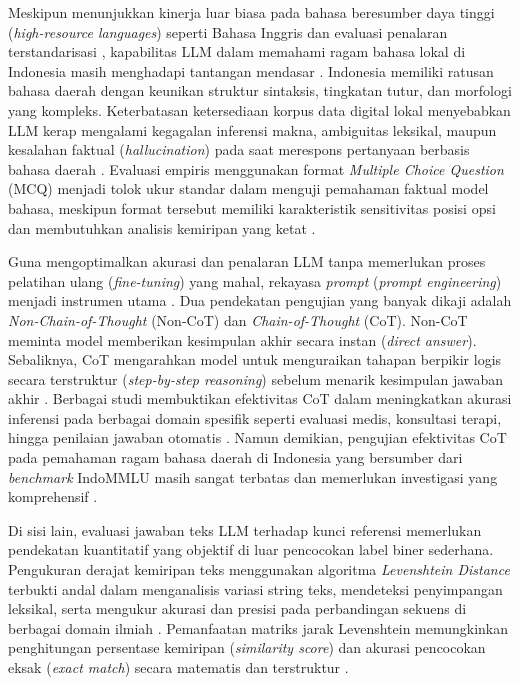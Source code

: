 \documentclass[10pt,a4paper]{article}
\begin{document}
Meskipun menunjukkan kinerja luar biasa pada bahasa beresumber daya tinggi (\textit{high-resource languages}) seperti Bahasa Inggris dan evaluasi penalaran terstandarisasi \cite{hendrycks2021measuring}, kapabilitas LLM dalam memahami ragam bahasa lokal di Indonesia masih menghadapi tantangan mendasar \cite{koto2023indommlu}. Indonesia memiliki ratusan bahasa daerah dengan keunikan struktur sintaksis, tingkatan tutur, dan morfologi yang kompleks. Keterbatasan ketersediaan korpus data digital lokal menyebabkan LLM kerap mengalami kegagalan inferensi makna, ambiguitas leksikal, maupun kesalahan faktual (\textit{hallucination}) pada saat merespons pertanyaan berbasis bahasa daerah \cite{koto2023indommlu, mugaanyi2024evaluation}. Evaluasi empiris menggunakan format \textit{Multiple Choice Question} (MCQ) menjadi tolok ukur standar dalam menguji pemahaman faktual model bahasa, meskipun format tersebut memiliki karakteristik sensitivitas posisi opsi dan membutuhkan analisis kemiripan yang ketat \cite{li2024multiple}.

Guna mengoptimalkan akurasi dan penalaran LLM tanpa memerlukan proses pelatihan ulang (\textit{fine-tuning}) yang mahal, rekayasa \textit{prompt} (\textit{prompt engineering}) menjadi instrumen utama \cite{chen2023when, kim2023cot}. Dua pendekatan pengujian yang banyak dikaji adalah \textit{Non-Chain-of-Thought} (Non-CoT) dan \textit{Chain-of-Thought} (CoT). Non-CoT meminta model memberikan kesimpulan akhir secara instan (\textit{direct answer}). Sebaliknya, CoT mengarahkan model untuk menguraikan tahapan berpikir logis secara terstruktur (\textit{step-by-step reasoning}) sebelum menarik kesimpulan jawaban akhir \cite{lee2024applying, ji2024chain, ji2025evaluating}. Berbagai studi membuktikan efektivitas CoT dalam meningkatkan akurasi inferensi pada berbagai domain spesifik seperti evaluasi medis, konsultasi terapi, hingga penilaian jawaban otomatis \cite{ting2024performance, zhu2025assessing, lim2023benchmarking, tsai2025optimizing}. Namun demikian, pengujian efektivitas CoT pada pemahaman ragam bahasa daerah di Indonesia yang bersumber dari \textit{benchmark} IndoMMLU masih sangat terbatas dan memerlukan investigasi yang komprehensif \cite{koto2023indommlu}.

Di sisi lain, evaluasi jawaban teks LLM terhadap kunci referensi memerlukan pendekatan kuantitatif yang objektif di luar pencocokan label biner sederhana. Pengukuran derajat kemiripan teks menggunakan algoritma \textit{Levenshtein Distance} terbukti andal dalam menganalisis variasi string teks, mendeteksi penyimpangan leksikal, serta mengukur akurasi dan presisi pada perbandingan sekuens di berbagai domain ilmiah \cite{beernaerts2019method, lindcombs2023comparing, song2024sidildng, berger2021levenshtein, petty2022new, sandamette2025penerapan, young2021levenshtein, suharto2025comparative}. Pemanfaatan matriks jarak Levenshtein memungkinkan penghitungan persentase kemiripan (\textit{similarity score}) dan akurasi pencocokan eksak (\textit{exact match}) secara matematis dan terstruktur \cite{berger2021levenshtein, sandamette2025penerapan}.
\end{document}
